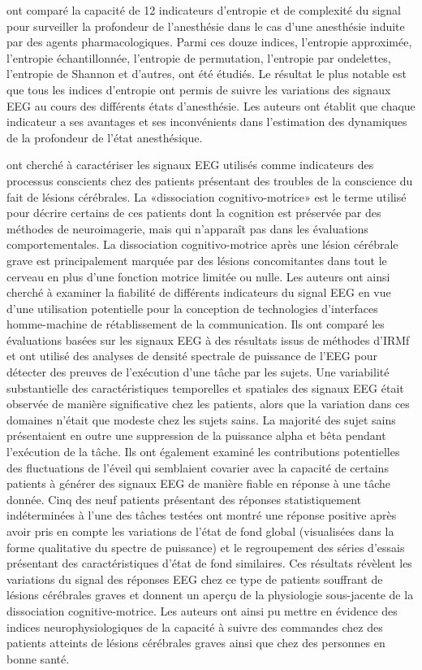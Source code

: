 \cite{liang2015eeg} ont comparé la capacité de 12 indicateurs d'entropie et de complexité du signal pour surveiller la profondeur de l'anesthésie dans le cas d'une anesthésie induite par des agents pharmacologiques. 
Parmi ces douze indices, l'entropie approximée, l'entropie échantillonnée, l'entropie de permutation, l'entropie par ondelettes, l'entropie de Shannon et d'autres, ont été étudiés. 
Le résultat le plus notable est que tous les indices d'entropie ont permis de suivre les variations des signaux EEG au cours des différents états d'anesthésie. 
Les auteurs ont établit que chaque indicateur a ses avantages et ses inconvénients dans l'estimation des dynamiques de la profondeur de l'état anesthésique. 

\cite{curley2018characterization} ont cherché à caractériser les signaux EEG utilisés comme indicateurs des processus conscients chez des patients présentant des troubles de la conscience du fait de lésions cérébrales.
La «dissociation cognitivo-motrice» est le terme utilisé pour décrire certains de ces patients dont la cognition est préservée par des méthodes de neuroimagerie, mais qui n'apparaît pas dans les évaluations comportementales. 
La dissociation cognitivo-motrice après une lésion cérébrale grave est principalement marquée par des lésions concomitantes dans tout le cerveau en plus d'une fonction motrice limitée ou nulle. 
Les auteurs ont ainsi cherché à examiner la fiabilité de différents indicateurs du signal EEG en vue d'une utilisation potentielle pour la conception de technologies d'interfaces homme-machine de rétablissement de la communication. 
Ils ont comparé les évaluations basées sur les signaux EEG à des résultats issus de méthodes d'IRMf et ont utilisé des analyses de densité spectrale de puissance de l'EEG pour détecter des preuves de l'exécution d'une tâche par les sujets. 
Une variabilité substantielle des caractéristiques temporelles et spatiales des signaux EEG était observée de manière significative chez les patients, alors que la variation dans ces domaines n'était que modeste chez les sujets sains. 
La majorité des sujet sains présentaient en outre une suppression de la puissance alpha et bêta pendant l'exécution de la tâche.
Ils ont également examiné les contributions potentielles des fluctuations de l'éveil qui semblaient covarier avec la capacité de certains patients à générer des signaux EEG de manière fiable en réponse à une tâche donnée. 
Cinq des neuf patients présentant des réponses statistiquement indéterminées à l'une des tâches testées ont montré une réponse positive après avoir pris en compte les variations de l'état de fond global (visualisées dans la forme qualitative du spectre de puissance) et le regroupement des séries d'essais présentant des caractéristiques d'état de fond similaires. 
Ces résultats révèlent les variations du signal des réponses EEG chez ce type de patients souffrant de lésions cérébrales graves et donnent un aperçu de la physiologie sous-jacente de la dissociation cognitive-motrice.
Les auteurs ont ainsi pu mettre en évidence des indices neurophysiologiques de la capacité à suivre des commandes chez des patients atteints de lésions cérébrales graves ainsi que chez des personnes en bonne santé. 

